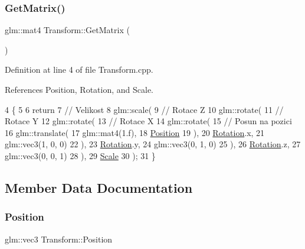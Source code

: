 \subsubsection{\texorpdfstring{Get\+Matrix()}{GetMatrix()}}
{\footnotesize\ttfamily glm\+::mat4 Transform\+::\+Get\+Matrix (\begin{DoxyParamCaption}{ }\end{DoxyParamCaption})}



Definition at line 4 of file Transform.\+cpp.



References Position, Rotation, and Scale.


\begin{DoxyCode}
4                              \{
5 
6     \textcolor{keywordflow}{return}
7         \textcolor{comment}{// Velikost}
8         glm::scale(
9             \textcolor{comment}{// Rotace Z}
10             glm::rotate(
11                 \textcolor{comment}{// Rotace Y}
12                 glm::rotate(
13                     \textcolor{comment}{// Rotace X}
14                     glm::rotate(
15                         \textcolor{comment}{// Posun na pozici}
16                         glm::translate(
17                             glm::mat4(1.f),
18                             \mbox{\hyperlink{classTransform_a1ee81ac62c423e027d979454a373b991}{Position}}
19                         ),
20                         \mbox{\hyperlink{classTransform_a0b39a3cad853ab427a91b761d82440d2}{Rotation}}.x,
21                         glm::vec3(1, 0, 0)
22                     ),
23                     \mbox{\hyperlink{classTransform_a0b39a3cad853ab427a91b761d82440d2}{Rotation}}.y,
24                     glm::vec3(0, 1, 0)
25                 ),
26                 \mbox{\hyperlink{classTransform_a0b39a3cad853ab427a91b761d82440d2}{Rotation}}.z,
27                 glm::vec3(0, 0, 1)
28             ),
29             \mbox{\hyperlink{classTransform_a337690a3de8862de2f930e9ee1323365}{Scale}}
30         );
31 \}
\end{DoxyCode}


\subsection{Member Data Documentation}
\mbox{\label{classTransform_a1ee81ac62c423e027d979454a373b991}} 
\subsubsection{\texorpdfstring{Position}{Position}}
{\footnotesize\ttfamily glm\+::vec3 Transform\+::\+Position}



